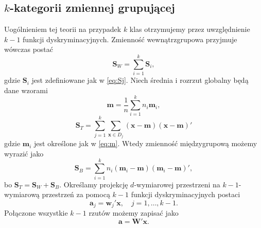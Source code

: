 \documentclass[]{book}
\theoremstyle{plain}
\theoremstyle{definition}
\theoremstyle{definition}
\theoremstyle{definition}
\theoremstyle{definition}
\theoremstyle{remark}
\begin{document}
\hypertarget{k-kategorii-zmiennej-grupujacej}{%
\subsection{\texorpdfstring{\(k\)-kategorii zmiennej grupującej}{k-kategorii zmiennej grupującej}}\label{k-kategorii-zmiennej-grupujacej}}

Uogólnieniem tej teorii na przypadek \(k\) klas otrzymujemy przez uwzględnienie \(k-1\) funkcji dyskryminacyjnych. Zmienność wewnątrzgrupowa przyjmuje wówczas postać
\begin{equation}
    \boldsymbol{S}_W=\sum_{i=1}^k\boldsymbol{S}_i,
\end{equation}
gdzie \(\boldsymbol{S}_i\) jest zdefiniowane jak w \eqref{eq:Sj}.
Niech średnia i rozrzut globalny będą dane wzorami
\begin{equation}
    \boldsymbol{m}=\frac{1}{n}\sum_{i=1}^kn_i\boldsymbol{m}_i,
\end{equation}
\begin{equation}
    \boldsymbol{S}_T=\sum_{j=1}^k\sum_{\boldsymbol{x}\in D_j}(\boldsymbol{x}-\boldsymbol{m})(\boldsymbol{x}-\boldsymbol{m})'
\end{equation}
gdzie \(\boldsymbol{m}_i\) jest określone jak w \eqref{eq:m}. Wtedy zmienność międzygrupową możemy wyrazić jako
\begin{equation}
    \boldsymbol{S}_B=\sum_{i=1}^kn_i(\boldsymbol{m}_i-\boldsymbol{m})(\boldsymbol{m}_i-\boldsymbol{m})',
\end{equation}
bo \(\boldsymbol{S}_T=\boldsymbol{S}_W+\boldsymbol{S}_B.\)
Określamy projekcję \(d\)-wymiarowej przestrzeni na \(k-1\)-wymiarową przestrzeń za pomocą \(k-1\) funkcji dyskryminacyjnych postaci
\begin{equation}
    \boldsymbol{a}_j=\boldsymbol{w}_j'\boldsymbol{x}, \quad j=1,\ldots,k-1.
\end{equation}
Połączone wszystkie \(k-1\) rzutów możemy zapisać jako
\begin{equation}
    \boldsymbol{a}=\boldsymbol{W}'\boldsymbol{x}.
\end{equation}
\end{document}
